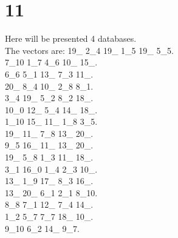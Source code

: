 \chapter{11}
\indent Here will be presented 4 databases.\\
The vectors are:
19\_ 2\_4 19\_ 1\_5 19\_ 5\_5.\\7\_10 1\_7 4\_6 10\_ 15\_.\\6\_6 5\_1 13\_ 7\_3 11\_.\\20\_ 8\_4 10\_ 2\_8 8\_1.\\3\_4 19\_ 5\_2 8\_2 18\_.\\10\_0 12\_ 5\_4 14\_ 18\_.\\1\_10 15\_ 11\_ 1\_8 3\_5.\\19\_ 11\_ 7\_8 13\_ 20\_.\\9\_5 16\_ 11\_ 13\_ 20\_.\\19\_ 5\_8 1\_3 11\_ 18\_.\\3\_1 16\_0 1\_4 2\_3 10\_.\\13\_ 1\_9 17\_ 8\_3 16\_.\\13\_ 20\_ 6\_1 2\_1 8\_10.\\8\_8 7\_1 12\_ 7\_4 14\_.\\1\_2 5\_7 7\_7 18\_ 10\_.\\9\_10 6\_2 14\_ 9\_7.\\